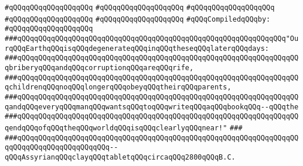 \verb|#qQQqqQQqqQQqqQQqqQQq|\newline
\verb|#qQQqqQQqqQQqqQQqqQQq|\newline
\verb|#qQQqqQQqqQQqqQQqqQQq|\newline
\verb|#qQQqqQQqqQQqqQQqqQQq|\newline
\verb|#qQQqqQQqqQQqqQQqqQQq|\newline
\newline
\verb|#qQQqCompiledqQQqby:|\newline
\verb|#qQQqqQQqqQQqqQQqqQQq|\newline
\newline
\newline
\newline
\verb|###qQQqqQQqqQQqqQQqqQQqqQQqqQQqqQQqqQQqqQQqqQQqqQQqqQQqqQQqqQQqqQQq"OurqQQqEarthqQQqisqQQqdegenerateqQQqinqQQqtheseqQQqlaterqQQqdays:|\newline
\verb|###qQQqqQQqqQQqqQQqqQQqqQQqqQQqqQQqqQQqqQQqqQQqqQQqqQQqqQQqqQQqqQQqqQQqbriberyqQQqandqQQqcorruptionqQQqareqQQqrife,|\newline
\verb|###qQQqqQQqqQQqqQQqqQQqqQQqqQQqqQQqqQQqqQQqqQQqqQQqqQQqqQQqqQQqqQQqqQQqchildrenqQQqnoqQQqlongerqQQqobeyqQQqtheirqQQqparents,|\newline
\verb|###qQQqqQQqqQQqqQQqqQQqqQQqqQQqqQQqqQQqqQQqqQQqqQQqqQQqqQQqqQQqqQQqqQQqandqQQqeveryqQQqmanqQQqwantsqQQqtoqQQqwriteqQQqaqQQqbookqQQq--qQQqthe|\newline
\verb|###qQQqqQQqqQQqqQQqqQQqqQQqqQQqqQQqqQQqqQQqqQQqqQQqqQQqqQQqqQQqqQQqqQQqendqQQqofqQQqtheqQQqworldqQQqisqQQqclearlyqQQqnear!"|\newline
\verb|###|\newline
\verb|###qQQqqQQqqQQqqQQqqQQqqQQqqQQqqQQqqQQqqQQqqQQqqQQqqQQqqQQqqQQqqQQqqQQqqQQqqQQqqQQqqQQqqQQqqQQq--qQQqAssyrianqQQqclayqQQqtabletqQQqcircaqQQq2800qQQqB.C.|\newline
\newline
\newline

